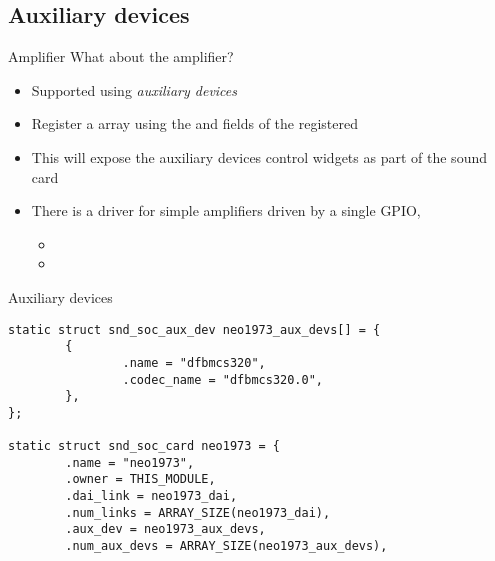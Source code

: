 \subsection{Auxiliary devices}

\begin{frame}{Amplifier}
  What about the amplifier?
  \begin{itemize}
  \item Supported using {\em auxiliary devices}
  \item Register a  array using the
     and  fields of the registered
  \item This will expose the auxiliary devices control widgets as part
    of the sound card
  \item There is a driver for simple amplifiers driven by a single
    GPIO, 
    \begin{itemize}
      \item {}
      \item {}
    \end{itemize}
  \end{itemize}
\end{frame}

\begin{frame}[fragile]{Auxiliary devices}
  \begin{block}{}
    \fontsize{9}{9}\selectfont
    \begin{verbatim}
static struct snd_soc_aux_dev neo1973_aux_devs[] = {
        {
                .name = "dfbmcs320",
                .codec_name = "dfbmcs320.0",
        },
};

static struct snd_soc_card neo1973 = {
        .name = "neo1973",
        .owner = THIS_MODULE,
        .dai_link = neo1973_dai,
        .num_links = ARRAY_SIZE(neo1973_dai),
        .aux_dev = neo1973_aux_devs,
        .num_aux_devs = ARRAY_SIZE(neo1973_aux_devs),
    \end{verbatim}
  \end{block}
\end{frame}

